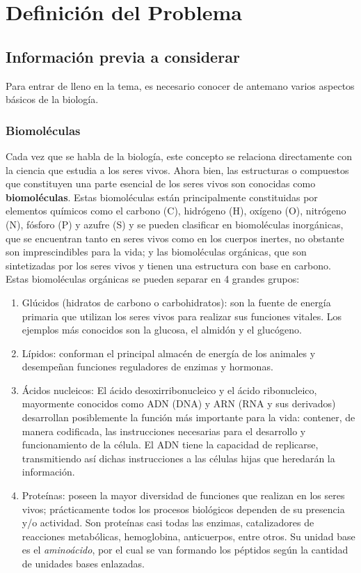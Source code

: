 \chapter{Definici\'on del Problema}

\section{Información previa a considerar}

Para entrar de lleno en la tema, es necesario conocer de antemano varios aspectos básicos de la biología.

\subsection{Biomoléculas}

Cada vez que se habla de la biología, este concepto se relaciona directamente con la ciencia que estudia a los seres vivos. Ahora bien, las estructuras o compuestos que constituyen una parte esencial de los seres vivos son conocidas como \textbf{biomoléculas}. Estas biomoléculas están principalmente constituidas por elementos químicos como el carbono (C), hidrógeno (H), oxígeno (O), nitrógeno (N), fósforo (P) y azufre (S) \cite{biomolecula} y se pueden clasificar en biomoléculas inorgánicas, que se encuentran tanto en seres vivos como en los cuerpos inertes, no obstante son imprescindibles para la vida; y las biomoléculas orgánicas, que son sintetizadas por los seres vivos y tienen una estructura con base en carbono. Estas biomoléculas orgánicas se pueden separar en 4 grandes grupos:
\begin{enumerate}
\item Glúcidos (hidratos de carbono o carbohidratos): son la fuente de energía primaria que utilizan los seres vivos para realizar sus funciones vitales. Los ejemplos más conocidos son la glucosa, el almidón y el glucógeno.
\item Lípidos: conforman el principal almacén de energía de los animales y desempeñan funciones reguladores de enzimas y hormonas.
\item Ácidos nucleicos: El ácido desoxirribonucleico y el ácido ribonucleico, mayormente conocidos como ADN (DNA) y ARN (RNA y sus derivados) desarrollan posiblemente la función más importante para la vida: contener, de manera codificada, las instrucciones necesarias para el desarrollo y funcionamiento de la célula. El ADN tiene la capacidad de replicarse, transmitiendo así dichas instrucciones a las células hijas que heredarán la información.
\item Proteínas: poseen la mayor diversidad de funciones que realizan en los seres vivos; prácticamente todos los procesos biológicos dependen de su presencia y/o actividad. Son proteínas casi todas las enzimas, catalizadores de reacciones metabólicas, hemoglobina, anticuerpos, entre otros. Su unidad base es el {\it{aminoácido}}, por el cual se van formando los péptidos según la cantidad de unidades bases enlazadas.
\end{enumerate}

